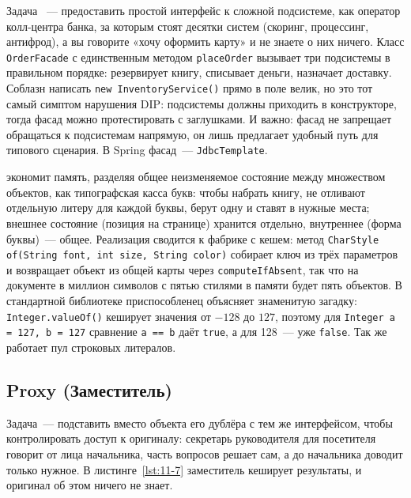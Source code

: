 Задача ~--- предоставить простой интерфейс к сложной подсистеме,
как оператор колл-центра банка, за которым стоят десятки систем (скоринг,
процессинг, антифрод), а вы говорите «хочу оформить карту» и не знаете о них
ничего. Класс \texttt{OrderFacade} с единственным методом \texttt{placeOrder}
вызывает три подсистемы в правильном порядке: резервирует книгу, списывает
деньги, назначает доставку. Соблазн написать \texttt{new InventoryService()}
прямо в поле велик, но это тот самый симптом нарушения DIP: подсистемы должны
приходить в конструкторе, тогда фасад можно протестировать с заглушками. И
важно: фасад не запрещает обращаться к подсистемам напрямую, он лишь предлагает
удобный путь для типового сценария. В Spring фасад~--- \texttt{JdbcTemplate}.

 экономит память, разделяя общее неизменяемое состояние
между множеством объектов, как типографская касса букв: чтобы набрать книгу, не
отливают отдельную литеру для каждой буквы, берут одну и ставят в нужные места;
внешнее состояние (позиция на странице) хранится отдельно, внутреннее (форма
буквы)~--- общее. Реализация сводится к фабрике с кешем: метод
\texttt{CharStyle of(String font, int size, String color)} собирает ключ из трёх
параметров и возвращает объект из общей карты через \texttt{computeIfAbsent}, так
что на документе в миллион символов с пятью стилями в памяти будет пять
объектов. В стандартной библиотеке приспособленец объясняет знаменитую загадку:
\texttt{Integer.valueOf()} кеширует значения от $-128$ до $127$, поэтому для
\texttt{Integer a = 127, b = 127} сравнение \texttt{a == b} даёт \texttt{true},
а для 128~--- уже \texttt{false}. Так же работает пул строковых литералов.

\subsection{Proxy (Заместитель)}

Задача~--- подставить вместо объекта его дублёра с тем же интерфейсом, чтобы
контролировать доступ к оригиналу: секретарь руководителя для посетителя говорит
от лица начальника, часть вопросов решает сам, а до начальника доводит только
нужное. В листинге~\ref{lst:11-7} заместитель кеширует результаты, и оригинал об
этом ничего не знает.


